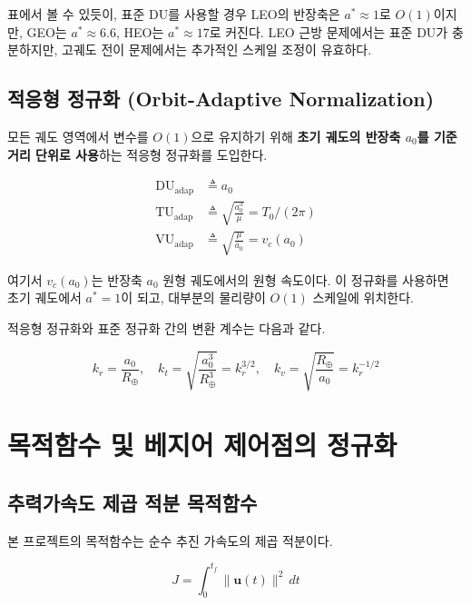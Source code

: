 \documentclass[11pt]{article}
\begin{document}
표에서 볼 수 있듯이, 표준 DU를 사용할 경우 LEO의 반장축은 $a^* \approx 1$로 $O(1)$이지만,
GEO는 $a^* \approx 6.6$, HEO는 $a^* \approx 17$로 커진다.
LEO 근방 문제에서는 표준 DU가 충분하지만, 고궤도 전이 문제에서는 추가적인 스케일 조정이 유효하다.

\subsection{적응형 정규화 (Orbit-Adaptive Normalization)}

모든 궤도 영역에서 변수를 $O(1)$으로 유지하기 위해 \textbf{초기 궤도의 반장축 $a_0$를 기준 거리 단위로 사용}하는
적응형 정규화를 도입한다.

\begin{align}
  \text{DU}_{\text{adap}} &\triangleq a_0 \label{eq:DU_adap}\\
  \text{TU}_{\text{adap}} &\triangleq \sqrt{\frac{a_0^3}{\mu}} = T_0 / (2\pi) \label{eq:TU_adap}\\
  \text{VU}_{\text{adap}} &\triangleq \sqrt{\frac{\mu}{a_0}} = v_c(a_0) \label{eq:VU_adap}
\end{align}

여기서 $v_c(a_0)$는 반장축 $a_0$ 원형 궤도에서의 원형 속도이다.
이 정규화를 사용하면 초기 궤도에서 $a^* = 1$이 되고, 대부분의 물리량이 $O(1)$ 스케일에 위치한다.

적응형 정규화와 표준 정규화 간의 변환 계수는 다음과 같다.

\begin{equation}
  k_r = \frac{a_0}{R_\oplus}, \quad
  k_t = \sqrt{\frac{a_0^3}{R_\oplus^3}} = k_r^{3/2}, \quad
  k_v = \sqrt{\frac{R_\oplus}{a_0}} = k_r^{-1/2}
  \label{eq:conversion_factors}
\end{equation}

\section{목적함수 및 베지어 제어점의 정규화}

\subsection{추력가속도 제곱 적분 목적함수}

본 프로젝트의 목적함수는 순수 추진 가속도의 제곱 적분이다.

\begin{equation}
  J = \int_0^{t_f} \|\mathbf{u}(t)\|^2 \, dt
\end{equation}
\end{document}
